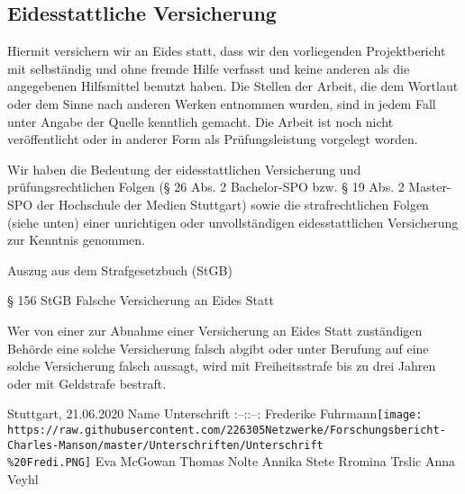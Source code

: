 \documentclass[
]{article}
\begin{document}
\hypertarget{eidesstattliche-versicherung}{%
\subsection{Eidesstattliche
Versicherung}\label{eidesstattliche-versicherung}}

Hiermit versichern wir an Eides statt, dass wir den vorliegenden
Projektbericht mit selbständig und ohne fremde Hilfe verfasst und keine
anderen als die angegebenen Hilfsmittel benutzt haben. Die Stellen der
Arbeit, die dem Wortlaut oder dem Sinne nach anderen Werken entnommen
wurden, sind in jedem Fall unter Angabe der Quelle kenntlich gemacht.
Die Arbeit ist noch nicht veröffentlicht oder in anderer Form als
Prüfungsleistung vorgelegt worden.

Wir haben die Bedeutung der eidesstattlichen Versicherung und
prüfungsrechtlichen Folgen (§ 26 Abs. 2 Bachelor-SPO bzw. § 19 Abs. 2
Master-SPO der Hochschule der Medien Stuttgart) sowie die
strafrechtlichen Folgen (siehe unten) einer unrichtigen oder
unvollständigen eidesstattlichen Versicherung zur Kenntnis genommen.

Auszug aus dem Strafgesetzbuch (StGB)

§ 156 StGB Falsche Versicherung an Eides Statt

Wer von einer zur Abnahme einer Versicherung an Eides Statt zuständigen
Behörde eine solche Versicherung falsch abgibt oder unter Berufung auf
eine solche Versicherung falsch aussagt, wird mit Freiheitsstrafe bis zu
drei Jahren oder mit Geldstrafe bestraft.

Stuttgart, 21.06.2020 \textbar{} Name\textbar{} Unterschrift\textbar{}
\textbar:--:\textbar:--:\textbar{} \textbar{} Frederike
Fuhrmann\textbar{}\texttt{[image: https://raw.githubusercontent.com/226305Netzwerke/Forschungsbericht-Charles-Manson/master/Unterschriften/Unterschrift\\\%20Fredi.PNG]}
\textbar{} \textbar{} Eva McGowan\textbar{} \textbar{} \textbar{} Thomas
Nolte\textbar{} \textbar{} \textbar{} Annika Stete\textbar{} \textbar{}
\textbar{} Rromina Trslic\textbar{} \textbar{} \textbar{} Anna
Veyhl\textbar{} \textbar{}
\end{document}
